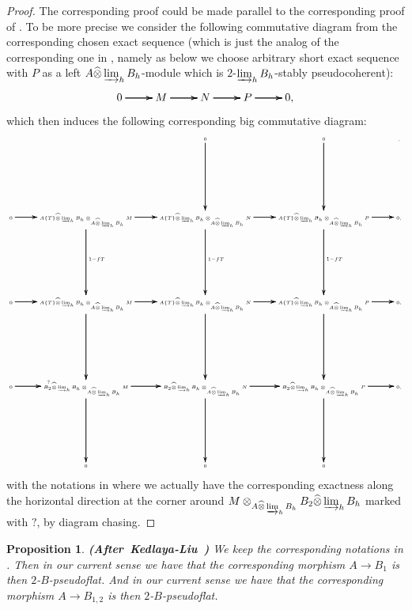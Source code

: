 \documentclass[12pt]{amsart}
\newtheorem{proposition}[theorem]{Proposition}
\theoremstyle{definition}
\numberwithin{equation}{section}
\begin{document}
\begin{proof}
The corresponding proof could be made parallel to the corresponding proof of \cite[Lemma 2.4.12]{KL2}. To be more precise we consider the following commutative diagram from the corresponding chosen exact sequence (which is just the analog of the corresponding one in \cite[Lemma 2.4.12]{KL2}, namely as below we choose arbitrary short exact sequence with $P$ as a left $A\widehat{\otimes}\varinjlim_h B_h$-module which is $2$-$\varinjlim_h B_h$-stably pseudocoherent):
\[
\xymatrix@C+0pc@R+0pc{
0   \ar[r]\ar[r]\ar[r] &M \ar[r]\ar[r]\ar[r] &N \ar[r]\ar[r]\ar[r] & P \ar[r]\ar[r]\ar[r] &0,
}
\]
which then induces the following corresponding big commutative diagram:
\[\tiny
\xymatrix@C+0pc@R+4pc{
& &0 \ar[d]\ar[d]\ar[d] &0 \ar[d]\ar[d]\ar[d] &,\\
0   \ar[r]\ar[r]\ar[r]  &{A\{T\}\widehat{\otimes}\varinjlim_h B_h}\otimes_{A\widehat{\otimes}\varinjlim_h B_h} M \ar[r]\ar[r]\ar[r] \ar[d]^{1-fT}\ar[d]\ar[d] &{A\{T\}\widehat{\otimes}\varinjlim_h B_h}\otimes_{A\widehat{\otimes}\varinjlim_h B_h} N \ar[r]\ar[r]\ar[r] \ar[d]^{1-fT}\ar[d]\ar[d] &{A\{T\}\widehat{\otimes}\varinjlim_h B_h} \otimes_{A\widehat{\otimes}\varinjlim_h B_h}P \ar[r]\ar[r]\ar[r] \ar[d]^{1-fT}\ar[d]\ar[d] &0,\\
0   \ar[r]\ar[r]\ar[r] &{A\{T\}\widehat{\otimes}\varinjlim_h B_h}\otimes_{A\widehat{\otimes}\varinjlim_h B_h}M  \ar[r]\ar[r]\ar[r] \ar[d]\ar[d]\ar[d] &{A\{T\}\widehat{\otimes}\varinjlim_h B_h} \otimes_{A\widehat{\otimes}\varinjlim_h B_h}N\ar[r]\ar[r]\ar[r] \ar[d]\ar[d]\ar[d] & {A\{T\}\widehat{\otimes}\varinjlim_h B_h}\otimes_{A\widehat{\otimes}\varinjlim_h B_h}P \ar[r]\ar[r]\ar[r] \ar[d]\ar[d]\ar[d] &0,\\
0  \ar[r]^?\ar[r]\ar[r] &{B_2\widehat{\otimes}\varinjlim_h B_h}\otimes_{A\widehat{\otimes}\varinjlim_h B_h} M \ar[r]\ar[r]\ar[r] \ar[d]\ar[d]\ar[d] &{B_2\widehat{\otimes}\varinjlim_h B_h}\otimes_{A\widehat{\otimes}\varinjlim_h B_h}N \ar[r]\ar[r]\ar[r] \ar[d]\ar[d]\ar[d] & {B_2\widehat{\otimes}\varinjlim_h B_h}\otimes_{A\widehat{\otimes}\varinjlim_h B_h} P \ar[r]\ar[r]\ar[r] \ar[d]\ar[d]\ar[d] &0,\\
&0&0&0
}
\]
with the notations in \cite[Lemma 2.4.10]{KL2} where we actually have the corresponding exactness along the horizontal direction at the corner around $M\otimes_{A\widehat{\otimes}\varinjlim_h B_h} {B_2\widehat{\otimes}\varinjlim_h B_h}$ marked with $?$, by diagram chasing.
\end{proof}


\begin{proposition} \mbox{\bf{(After Kedlaya-Liu \cite[Lemma 2.4.13]{KL2})}} \label{proposition4.9}
We keep the corresponding notations in \cite[Lemma 2.4.10]{KL2}. Then in our current sense we have that the corresponding morphism $A\rightarrow B_1$ is then $2$-$B$-pseudoflat. And in our current sense we have that the corresponding morphism $A\rightarrow B_{1,2}$ is then $2$-$B$-pseudoflat. 
\end{proposition}
\end{document}
